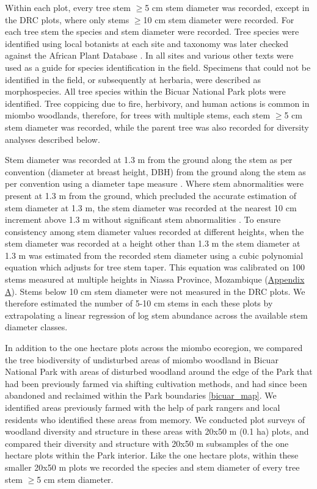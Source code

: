 \documentclass[diversity,article,submit,moreauthors,pdftex]{Definitions/mdpi}
\begin{document}
Within each plot, every tree stem $\ge$5 cm stem diameter was recorded, except in the DRC plots, where only stems $\ge$10 cm stem diameter were recorded. For each tree stem the species and stem diameter were recorded. Tree species were identified using local botanists at each site and taxonomy was later checked against the African Plant Database \citep{APD2020}. In all sites \citet{Palgrave2003} and various other texts were used as a guide for species identification in the field. Specimens that could not be identified in the field, or subsequently at herbaria, were described as morphospecies. All tree species within the Bicuar National Park plots were identified. Tree coppicing due to fire, herbivory, and human actions is common in miombo woodlands, therefore, for trees with multiple stems, each stem $\ge$5 cm stem diameter was recorded, while the parent tree was also recorded for diversity analyses described below.   

Stem diameter was recorded at 1.3 m from the ground along the stem as per convention (diameter at breast height, DBH) from the ground along the stem as per convention using a diameter tape measure \citep{Kershaw2017}. Where stem abnormalities were present at 1.3 m from the ground, which precluded the accurate estimation of stem diameter at 1.3 m, the stem diameter was recorded at the nearest 10 cm increment above 1.3 m without significant stem abnormalities \citep{Kershaw2017}. To ensure consistency among stem diameter values recorded at different heights, when the stem diameter was recorded at a height other than 1.3 m the stem diameter at 1.3 m was estimated from the recorded stem diameter using a cubic polynomial equation which adjusts for tree stem taper. This equation was calibrated on 100 stems measured at multiple heights in Niassa Province, Mozambique (\hyperref[appendixa]{Appendix A}). Stems below 10 cm stem diameter were not measured in the DRC plots. We therefore estimated the number of 5-10 cm stems in each these plots by extrapolating a linear regression of log stem abundance across the available stem diameter classes.

In addition to the one hectare plots across the miombo ecoregion, we compared the tree biodiversity of undisturbed areas of miombo woodland in Bicuar National Park with areas of disturbed woodland around the edge of the Park that had been previously farmed via shifting cultivation methods, and had since been abandoned and reclaimed within the Park boundaries \autoref{bicuar_map}. We identified areas previously farmed with the help of park rangers and local residents who identified these areas from memory. We conducted \ndegradplots{} plot surveys of woodland diversity and structure in these areas with 20x50 m (0.1 ha) plots, and compared their diversity and structure with 20x50 m subsamples of the \nplotsbicuar{} one hectare plots within the Park interior. Like the one hectare plots, within these smaller 20x50 m plots we recorded the species and stem diameter of every tree stem $\ge$5 cm stem diameter.
\end{document}
